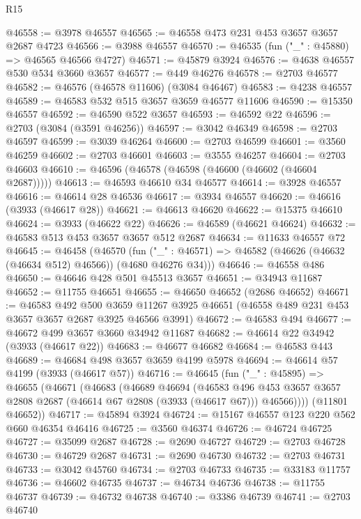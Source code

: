 \begin{lexlean}{R15}
\begin{coremodule}
@46558 := @3978 @46557
@46565 := @46558 @473 @231 @453 @3657 @3657 @2687 @4723
@46566 := @3988 @46557
@46570 := @46535 (fun ("_" : @45880) => @46565 @46566 @4727)
@46571 := @45879 @3924
@46576 := @4638 @46557 @530 @534 @3660 @3657
@46577 := @449 @46276
@46578 := @2703 @46577
@46582 := @46576 (@46578 @11606) (@3084 @46467)
@46583 := @4238 @46557
@46589 := @46583 @532 @515 @3657 @3659 @46577 @11606
@46590 := @15350 @46557
@46592 := @46590 @522 @3657
@46593 := @46592 @22
@46596 := @2703 (@3084 (@3591 @46256))
@46597 := @3042 @46349
@46598 := @2703 @46597
@46599 := @3039 @46264
@46600 := @2703 @46599
@46601 := @3560 @46259
@46602 := @2703 @46601
@46603 := @3555 @46257
@46604 := @2703 @46603
@46610 := @46596 (@46578 (@46598 (@46600 (@46602 (@46604 @2687)))))
@46613 := @46593 @46610 @34 @46577
@46614 := @3928 @46557
@46616 := @46614 @28 @46536
@46617 := @3934 @46557
@46620 := @46616 (@3933 (@46617 @28))
@46621 := @46613 @46620
@46622 := @15375 @46610
@46624 := @3933 (@46622 @22)
@46626 := @46589 (@46621 @46624)
@46632 := @46583 @513 @453 @3657 @3657 @512 @2687
@46634 := @11633 @46557 @72
@46645 := @46458
    (@46570
      (fun ("_" : @46571) => @46582 (@46626 (@46632 (@46634 @512) @46566)) (@4680 @46276 @34)))
@46646 := @46558 @486
@46650 := @46646 @428 @501 @45513 @3657
@46651 := @34943 @11687
@46652 := @11755 @46651
@46655 := @46650 @46652 (@2686 @46652)
@46671 := @46583
    @492
    @500
    @3659
    @11267
    @3925
    @46651
    (@46558 @489 @231 @453 @3657 @3657 @2687 @3925 @46566 @3991)
@46672 := @46583 @494
@46677 := @46672 @499 @3657 @3660 @34942 @11687
@46682 := @46614 @22 @34942 (@3933 (@46617 @22))
@46683 := @46677 @46682
@46684 := @46583 @443
@46689 := @46684 @498 @3657 @3659 @4199 @5978
@46694 := @46614 @57 @4199 (@3933 (@46617 @57))
@46716 := @46645
    (fun ("_" : @45895) =>
    @46655
      (@46671
        (@46683
          (@46689
            @46694
            (@46583
              @496
              @453
              @3657
              @3657
              @2808
              @2687
              (@46614 @67 @2808 (@3933 (@46617 @67)))
              @46566))))
      (@11801 @46652))
@46717 := @45894 @3924
@46724 := @15167 @46557 @123 @220 @562 @660 @46354 @46416
@46725 := @3560 @46374
@46726 := @46724 @46725
@46727 := @35099 @2687
@46728 := @2690 @46727
@46729 := @2703 @46728
@46730 := @46729 @2687
@46731 := @2690 @46730
@46732 := @2703 @46731
@46733 := @3042 @45760
@46734 := @2703 @46733
@46735 := @33183 @11757
@46736 := @46602 @46735
@46737 := @46734 @46736
@46738 := @11755 @46737
@46739 := @46732 @46738
@46740 := @3386 @46739
@46741 := @2703 @46740

\end{coremodule}
\end{lexlean}
